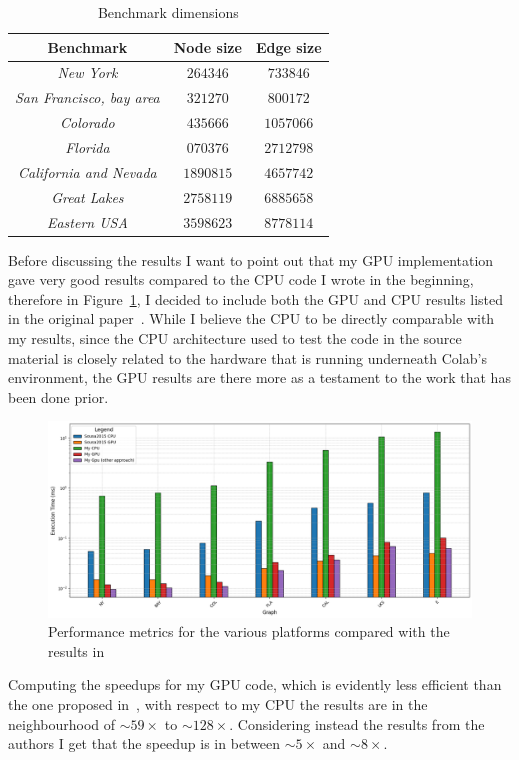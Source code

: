 \documentclass[a4paper,10pt]{article}
\begin{document}
\begin{longtable}{|c|c|c|}
	\caption{Benchmark dimensions}\label{tbl:benchmarks}
	\\\hline\textbf{Benchmark} & \textbf{Node size} & \textbf{Edge size} \\\hline\hline
	\endfirsthead\hline\endlastfoot

	\textit{New York}                & $\num{264346}$   & $\num{733846}$  \\\hline
	\textit{San Francisco, bay area} & $\num{321270}$   & $\num{800172}$  \\\hline
	\textit{Colorado}                & $\num{435666}$   & $\num{1057066}$ \\\hline
	\textit{Florida}                 & $\num{ 070376}$  & $\num{2712798}$ \\\hline
	\textit{California and Nevada}   & $\num{ 1890815}$ & $\num{4657742}$ \\\hline
	\textit{Great Lakes}             & $\num{2758119}$  & $\num{6885658}$ \\\hline
	\textit{Eastern USA}             & $\num{3598623}$  & $\num{8778114}$
\end{longtable}
Before discussing the results I want to point out that my GPU implementation gave very good results compared to the CPU code I wrote in the beginning, therefore in Figure~\ref{fig:results}, I decided to include both the GPU and CPU results listed in the original paper~\cite{generic-he-boruvka}. While I believe the CPU to be directly comparable with my results, since the CPU architecture used to test the code in the source material is closely related to the hardware that is running underneath Colab's environment, the GPU results are there more as a testament to the work that has been done prior.
\begin{figure}
	\centering
	\includegraphics[scale=0.4]{fig/benchmarks.png}
	\caption{Performance metrics for the various platforms compared with the results in \cite{generic-he-boruvka}}
	\label{fig:results}
\end{figure}
Computing the speedups for my GPU code, which is evidently less efficient than the one proposed in~\cite{generic-he-boruvka}, with respect to my CPU the results are in the neighbourhood of $\sim59\times$ to $\sim128\times$. Considering instead the results from the authors I get that the speedup is in between $\sim5\times$ and $\sim8\times$.
\end{document}
